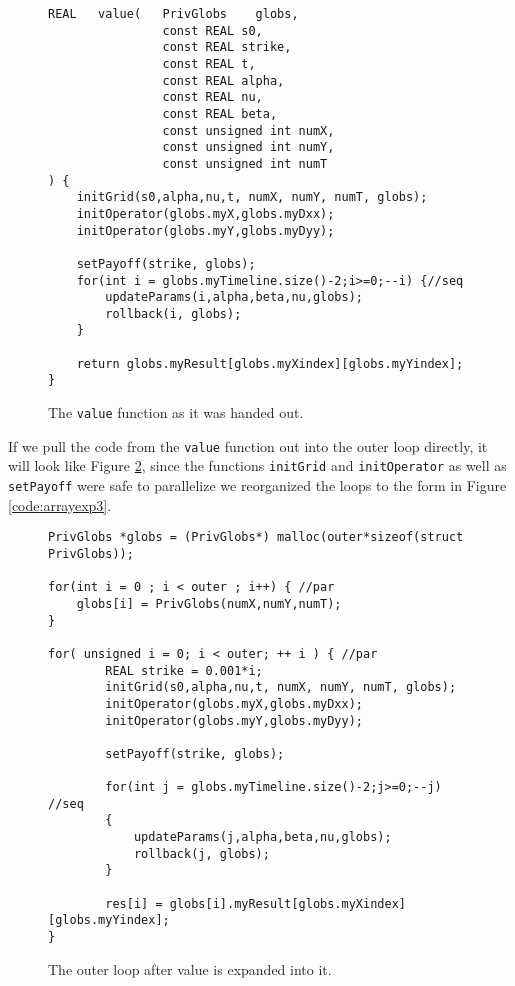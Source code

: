 \begin{figure}[H]
    \begin{lstlisting}
REAL   value(   PrivGlobs    globs,
                const REAL s0,
                const REAL strike,
                const REAL t,
                const REAL alpha,
                const REAL nu,
                const REAL beta,
                const unsigned int numX,
                const unsigned int numY,
                const unsigned int numT
) {
    initGrid(s0,alpha,nu,t, numX, numY, numT, globs);
    initOperator(globs.myX,globs.myDxx);
    initOperator(globs.myY,globs.myDyy);

    setPayoff(strike, globs);
    for(int i = globs.myTimeline.size()-2;i>=0;--i) {//seq
        updateParams(i,alpha,beta,nu,globs);
        rollback(i, globs);
    }

    return globs.myResult[globs.myXindex][globs.myYindex];
}
    \end{lstlisting}
    \caption{The \texttt{value} function as it was handed out.}
    \label{code:predistvalue}
\end{figure}

If we pull the code from the \texttt{value} function out into the outer loop
directly, it will look like Figure \ref{code:arrayexp2}, since the functions
\texttt{initGrid} and \texttt{initOperator} as well as \texttt{setPayoff} were
safe to parallelize we reorganized the loops to the form in Figure
\ref{code:arrayexp3}.

\begin{figure}[H]
    \begin{lstlisting}
PrivGlobs *globs = (PrivGlobs*) malloc(outer*sizeof(struct PrivGlobs));

for(int i = 0 ; i < outer ; i++) { //par
    globs[i] = PrivGlobs(numX,numY,numT);
}

for( unsigned i = 0; i < outer; ++ i ) { //par
        REAL strike = 0.001*i;
        initGrid(s0,alpha,nu,t, numX, numY, numT, globs);
        initOperator(globs.myX,globs.myDxx);
        initOperator(globs.myY,globs.myDyy);

        setPayoff(strike, globs);

        for(int j = globs.myTimeline.size()-2;j>=0;--j) //seq
        {
            updateParams(j,alpha,beta,nu,globs);
            rollback(j, globs);
        }

        res[i] = globs[i].myResult[globs.myXindex][globs.myYindex];
}
    \end{lstlisting}
    \caption{The outer loop after value is expanded into it.}
    \label{code:arrayexp2}
\end{figure}

